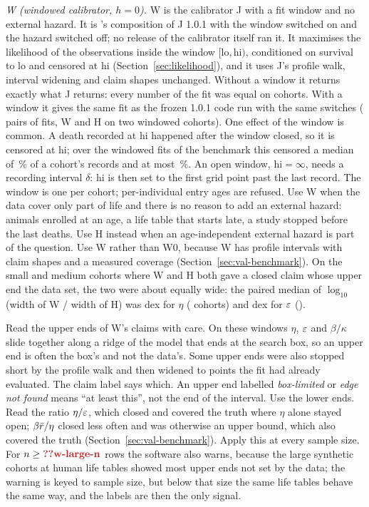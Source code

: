 \emph{W (windowed calibrator, $h=0$).} W is the calibrator J with a fit window and no external hazard. It is
's composition of J 1.0.1 with the window switched on and the hazard switched off; no release of the calibrator
itself ran it. It maximises the likelihood of the observations inside the window $[\mathrm{lo},\mathrm{hi})$, conditioned on
survival to $\mathrm{lo}$ and censored at $\mathrm{hi}$ (Section~\ref{sec:likelihood}), and it uses J's profile walk, interval
widening and claim shapes unchanged. Without a window it returns exactly what J returns: every number of the fit was equal on
 cohorts. With a window it gives the same fit as the frozen 1.0.1 code run with the same switches
( pairs of fits, W and H on two windowed cohorts). One effect of the window is common. A death recorded at
$\mathrm{hi}$ happened after the window closed, so it is censored at $\mathrm{hi}$; over the  windowed fits of
the benchmark this censored a median of \,\% of a cohort's records and at most \,\%. An open window,
$\mathrm{hi}=\infty$, needs a recording interval $\delta$: $\mathrm{hi}$ is then set to the first grid point past the last record.
The window is one per cohort; per-individual entry ages are refused. Use W when the data cover only part of life and there is
no reason to add an external hazard: animals enrolled at an age, a life table that starts late, a study stopped before the last
deaths. Use H instead when an age-independent external hazard is part of the question. Use W rather than W0, because W has
profile intervals with claim shapes and a measured coverage (Section~\ref{sec:val-benchmark}). On the small and medium cohorts
where W and H both gave a closed claim whose upper end the data set, the two were about equally wide: the paired median of
$\log_{10}$(width of W / width of H) was  dex for $\eta$ ( cohorts) and  dex for
$\varepsilon$ ().

Read the upper ends of W's claims with care. On these windows $\eta$, $\varepsilon$ and $\beta/\kappa$ slide together along a ridge
of the model that ends at the search box, so an upper end is often the box's and not the data's. Some upper ends were also stopped short by the
profile walk and then widened to points the fit had already evaluated. The claim label says which. An upper end labelled
\emph{box-limited} or \emph{edge not found} means ``at least this'', not the end of the interval. Use the lower ends. Read the
ratio $\eta/\varepsilon$, which closed and covered the truth where $\eta$ alone stayed open; $\beta\bar r/\eta$ closed less often and was
otherwise an upper bound, which also covered the truth (Section~\ref{sec:val-benchmark}). Apply this at every sample size. For $n\ge\C{w-large-n}$ rows the software also warns, because
the large synthetic cohorts at human life tables showed most upper ends not set by the data; the warning is keyed to sample
size, but below that size the same life tables behave the same way, and the labels are then the only signal.

